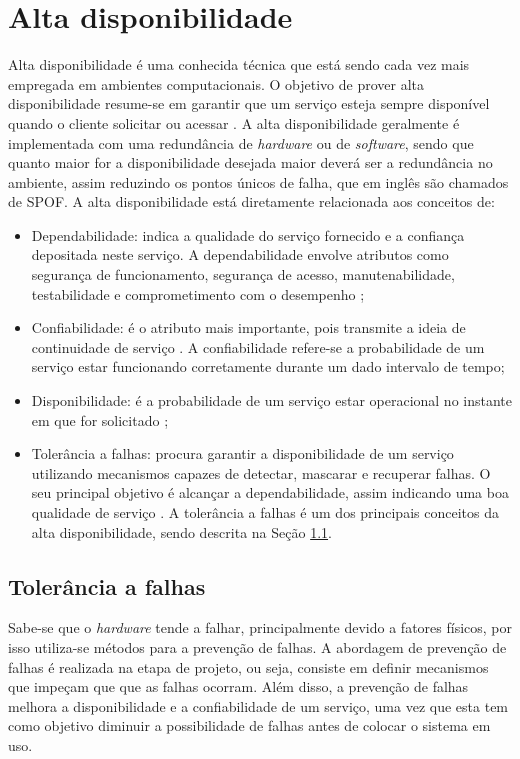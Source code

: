 \chapter{Alta disponibilidade}
\label{cap:altadisponibilidade}

Alta disponibilidade é uma conhecida técnica que está sendo cada vez mais empregada em ambientes computacionais. O objetivo de prover
alta disponibilidade resume-se em garantir que um serviço esteja sempre disponível quando o cliente solicitar ou acessar \cite{costa2009}.
A alta disponibilidade geralmente é implementada com uma redundância de \textit{hardware} ou de \textit{software}, sendo que quanto maior for 
a disponibilidade desejada maior deverá ser a redundância no ambiente, assim reduzindo os pontos únicos de falha, que em inglês são chamados 
de \ac{SPOF}. A alta disponibilidade está diretamente relacionada aos conceitos de: 
\begin{itemize}
 \item Dependabilidade: indica a qualidade do serviço fornecido e a confiança depositada neste serviço. A dependabilidade envolve atributos 
 como segurança de funcionamento, segurança de acesso, manutenabilidade, testabilidade e comprometimento com o desempenho \cite{weber2002};
 \item Confiabilidade: é o atributo mais importante, pois transmite a ideia de continuidade de serviço \cite{pankaj1994}. A confiabilidade 
 refere-se a probabilidade de um serviço estar funcionando corretamente durante um dado intervalo de tempo;
 \item Disponibilidade: é a probabilidade de um serviço estar operacional no instante em que for solicitado \cite{costa2009};
 \item Tolerância a falhas: procura garantir a disponibilidade de um serviço utilizando mecanismos capazes de detectar, mascarar e recuperar 
 falhas. O seu principal objetivo é alcançar a dependabilidade, assim indicando uma boa qualidade de serviço \cite{costa2009}. A tolerância a 
 falhas é um dos principais conceitos da alta disponibilidade, sendo descrita na Seção \ref{section:toleranciafalhas}.
\end{itemize}

\section{Tolerância a falhas}
\label{section:toleranciafalhas}

Sabe-se que o \textit{hardware} tende a falhar, principalmente devido a fatores físicos, por isso utiliza-se métodos para a prevenção 
de falhas. A abordagem de prevenção de falhas é realizada na etapa de projeto, ou seja, consiste em definir mecanismos que impeçam que 
que as falhas ocorram. Além disso, a prevenção de falhas melhora a disponibilidade e a confiabilidade de um serviço, uma vez que esta 
tem como objetivo diminuir a possibilidade de falhas antes de colocar o sistema em uso.

